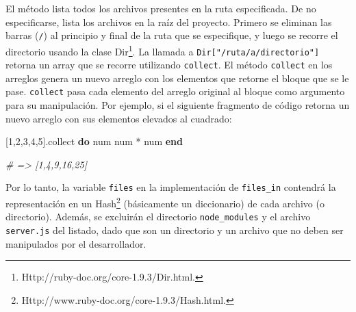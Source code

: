 \documentclass[12pt,spanish,letter]{report}
\newenvironment{Shaded}{}{}
\newcommand{\KeywordTok}[1]{\textcolor[rgb]{0.00,0.44,0.13}{\textbf{{#1}}}}
\newcommand{\DataTypeTok}[1]{\textcolor[rgb]{0.56,0.13,0.00}{{#1}}}
\newcommand{\DecValTok}[1]{\textcolor[rgb]{0.25,0.63,0.44}{{#1}}}
\newcommand{\StringTok}[1]{\textcolor[rgb]{0.25,0.44,0.63}{{#1}}}
\newcommand{\CommentTok}[1]{\textcolor[rgb]{0.38,0.63,0.69}{\textit{{#1}}}}
\newcommand{\OtherTok}[1]{\textcolor[rgb]{0.00,0.44,0.13}{{#1}}}
\newcommand{\NormalTok}[1]{{#1}}
\begin{document}
\begin{Shaded}
\end{Shaded}

El método lista todos los archivos presentes en la ruta especificada. De
no especificarse, lista los archivos en la raíz del proyecto. Primero se
eliminan las barras (\texttt{/}) al principio y final de la ruta que se
especifique, y luego se recorre el directorio usando la clase
Dir\footnote{Http://ruby-doc.org/core-1.9.3/Dir.html.}. La llamada a
\texttt{Dir{[}"/ruta/a/directorio"{]}} retorna un array que se recorre
utilizando \texttt{collect}. El método \texttt{collect} en los arreglos
genera un nuevo arreglo con los elementos que retorne el bloque que se
le pase. \texttt{collect} pasa cada elemento del arreglo original al
bloque como argumento para su manipulación. Por ejemplo, si el siguiente
fragmento de código retorna un nuevo arreglo con sus elementos elevados
al cuadrado:

\begin{Shaded}
\begin{Highlighting}[]
\NormalTok{[}\DecValTok{1}\NormalTok{,}\DecValTok{2}\NormalTok{,}\DecValTok{3}\NormalTok{,}\DecValTok{4}\NormalTok{,}\DecValTok{5}\NormalTok{].collect }\KeywordTok{do} \NormalTok{\textbar{}num\textbar{}}
  \NormalTok{num * num}
\KeywordTok{end}

\CommentTok{# => [1,4,9,16,25]}
\end{Highlighting}
\end{Shaded}

Por lo tanto, la variable \texttt{files} en la implementación de
\texttt{files\_in} contendrá la representación en un Hash\footnote{Http://www.ruby-doc.org/core-1.9.3/Hash.html.}
(básicamente un diccionario) de cada archivo (o directorio). Además, se
excluirán el directorio \texttt{node\_modules} y el archivo
\texttt{server.js} del listado, dado que son un directorio y un archivo
que no deben ser manipulados por el desarrollador.
\end{document}
